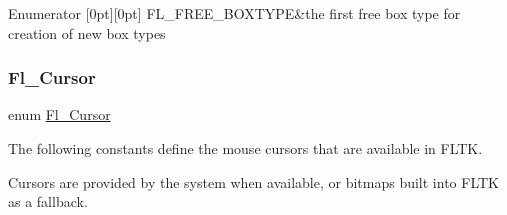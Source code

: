 \begin{DoxyEnumFields}{Enumerator}
[0pt][0pt]{}\mbox{\label{_enumerations_8_h_ae48bf9070f8541de17829f54ccacc6bcaa9653f0cfb77a72657c6b492cc27480b}} 
F\+L\+\_\+\+F\+R\+E\+E\+\_\+\+B\+O\+X\+T\+Y\+PE&the first free box type for creation of new box types \\
\hline

\end{DoxyEnumFields}
\mbox{\label{_enumerations_8_h_a72bde974edc7926b1217dd51b8c7e8e0}} 
\subsubsection{\texorpdfstring{Fl\+\_\+\+Cursor}{Fl\_Cursor}}
{\footnotesize\ttfamily enum \hyperlink{_enumerations_8_h_a72bde974edc7926b1217dd51b8c7e8e0}{Fl\+\_\+\+Cursor}}

The following constants define the mouse cursors that are available in F\+L\+TK.

Cursors are provided by the system when available, or bitmaps built into F\+L\+TK as a fallback.

